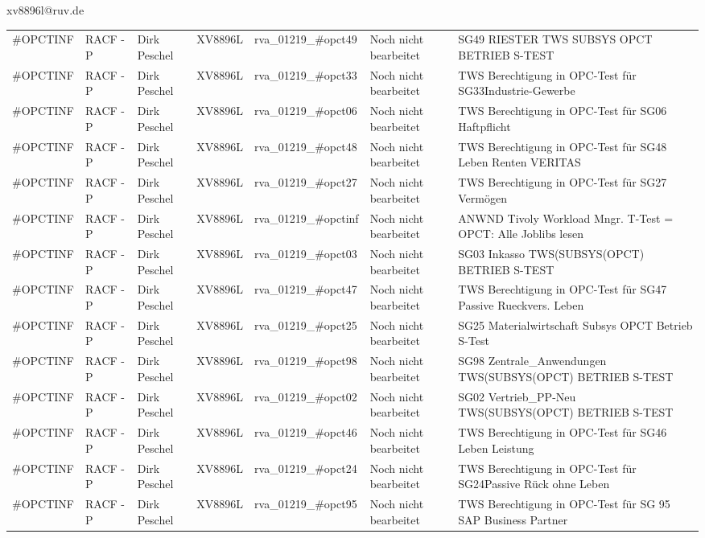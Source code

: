 \documentclass[a4paper,landscape,12pt]{letter}
\begin{document}
\begin{letter}{xv8896l@ruv.de\hfill \break}
\begin{tiny}
\begin{longtable}{|p{35mm}|p{15mm}|p{25mm}|p{10mm}|p{40mm}|p{50mm}|p{50mm}|}
\#OPCTINF & RACF - P & Dirk Peschel & XV8896L & rva\_01219\_\#opct49 & Noch nicht bearbeitet & SG49 RIESTER TWS SUBSYS OPCT BETRIEB S-TEST \\
\#OPCTINF & RACF - P & Dirk Peschel & XV8896L & rva\_01219\_\#opct33 & Noch nicht bearbeitet & TWS Berechtigung in OPC-Test für SG33Industrie-Gewerbe \\
\#OPCTINF & RACF - P & Dirk Peschel & XV8896L & rva\_01219\_\#opct06 & Noch nicht bearbeitet & TWS Berechtigung in OPC-Test für SG06 Haftpflicht \\
\#OPCTINF & RACF - P & Dirk Peschel & XV8896L & rva\_01219\_\#opct48 & Noch nicht bearbeitet & TWS Berechtigung in OPC-Test für SG48 Leben Renten VERITAS \\
\#OPCTINF & RACF - P & Dirk Peschel & XV8896L & rva\_01219\_\#opct27 & Noch nicht bearbeitet & TWS Berechtigung in OPC-Test für SG27 Vermögen \\
\#OPCTINF & RACF - P & Dirk Peschel & XV8896L & rva\_01219\_\#opctinf & Noch nicht bearbeitet & ANWND Tivoly Workload Mngr. T-Test = OPCT: Alle Joblibs lesen \\
\#OPCTINF & RACF - P & Dirk Peschel & XV8896L & rva\_01219\_\#opct03 & Noch nicht bearbeitet & SG03 Inkasso TWS(SUBSYS(OPCT) BETRIEB S-TEST \\
\#OPCTINF & RACF - P & Dirk Peschel & XV8896L & rva\_01219\_\#opct47 & Noch nicht bearbeitet & TWS Berechtigung in OPC-Test für SG47 Passive Rueckvers. Leben \\
\#OPCTINF & RACF - P & Dirk Peschel & XV8896L & rva\_01219\_\#opct25 & Noch nicht bearbeitet & SG25 Materialwirtschaft Subsys OPCT Betrieb S-Test \\
\#OPCTINF & RACF - P & Dirk Peschel & XV8896L & rva\_01219\_\#opct98 & Noch nicht bearbeitet & SG98 Zentrale\_Anwendungen TWS(SUBSYS(OPCT) BETRIEB S-TEST \\
\#OPCTINF & RACF - P & Dirk Peschel & XV8896L & rva\_01219\_\#opct02 & Noch nicht bearbeitet & SG02 Vertrieb\_PP-Neu TWS(SUBSYS(OPCT) BETRIEB S-TEST \\
\#OPCTINF & RACF - P & Dirk Peschel & XV8896L & rva\_01219\_\#opct46 & Noch nicht bearbeitet & TWS Berechtigung in OPC-Test für SG46 Leben Leistung \\
\#OPCTINF & RACF - P & Dirk Peschel & XV8896L & rva\_01219\_\#opct24 & Noch nicht bearbeitet & TWS Berechtigung in OPC-Test für SG24Passive Rück ohne Leben \\
\#OPCTINF & RACF - P & Dirk Peschel & XV8896L & rva\_01219\_\#opct95 & Noch nicht bearbeitet &  TWS Berechtigung in OPC-Test für SG 95 SAP Business Partner \\

\end{longtable}
\end{tiny}
\end{letter}
\end{document}
